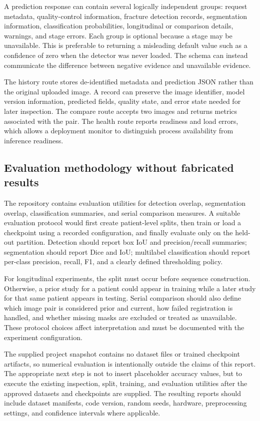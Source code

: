 \documentclass[12pt,a4paper]{article}
\begin{document}
A prediction response can contain several logically independent groups: request metadata, quality-control information, fracture detection records, segmentation information, classification probabilities, longitudinal or comparison details, warnings, and stage errors. Each group is optional because a stage may be unavailable. This is preferable to returning a misleading default value such as a confidence of zero when the detector was never loaded. The schema can instead communicate the difference between negative evidence and unavailable evidence.

The history route stores de-identified metadata and prediction JSON rather than the original uploaded image. A record can preserve the image identifier, model version information, predicted fields, quality state, and error state needed for later inspection. The compare route accepts two images and returns metrics associated with the pair. The health route reports readiness and load errors, which allows a deployment monitor to distinguish process availability from inference readiness.

\subsection{Evaluation methodology without fabricated results}
The repository contains evaluation utilities for detection overlap, segmentation overlap, classification summaries, and serial comparison measures. A suitable evaluation protocol would first create patient-level splits, then train or load a checkpoint using a recorded configuration, and finally evaluate only on the held-out partition. Detection should report box IoU and precision/recall summaries; segmentation should report Dice and IoU; multilabel classification should report per-class precision, recall, F1, and a clearly defined thresholding policy.

For longitudinal experiments, the split must occur before sequence construction. Otherwise, a prior study for a patient could appear in training while a later study for that same patient appears in testing. Serial comparison should also define which image pair is considered prior and current, how failed registration is handled, and whether missing masks are excluded or treated as unavailable. These protocol choices affect interpretation and must be documented with the experiment configuration.

The supplied project snapshot contains no dataset files or trained checkpoint artifacts, so numerical evaluation is intentionally outside the claims of this report. The appropriate next step is not to insert placeholder accuracy values, but to execute the existing inspection, split, training, and evaluation utilities after the approved datasets and checkpoints are supplied. The resulting reports should include dataset manifests, code version, random seeds, hardware, preprocessing settings, and confidence intervals where applicable.
\end{document}
